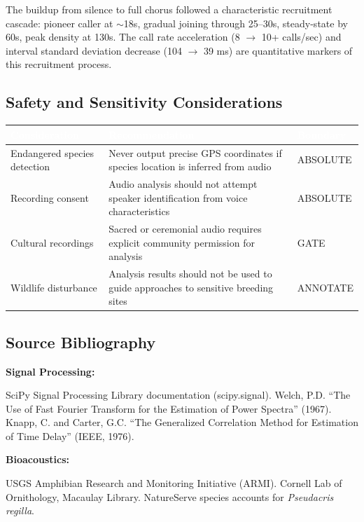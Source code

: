 \documentclass[11pt,letterpaper]{article}
\newcommand{\tableheader}[1]{\textbf{\sffamily\textcolor{white}{#1}}}
\begin{document}
The buildup from silence to full chorus followed a characteristic recruitment cascade: pioneer caller at $\sim$18s, gradual joining through 25--30s, steady-state by 60s, peak density at 130s. The call rate acceleration (8 $\rightarrow$ 10+ calls/sec) and interval standard deviation decrease (104 $\rightarrow$ 39 ms) are quantitative markers of this recruitment process.

\subsection{Safety and Sensitivity Considerations}

\begin{center}
\begin{tabularx}{\textwidth}{L{4cm}L{4cm}C{2.5cm}}
\toprule
{}
\tableheader{Consideration} & \tableheader{Recommendation} & \tableheader{Boundary} \\
\midrule
Endangered species detection & Never output precise GPS coordinates if species location is inferred from audio & ABSOLUTE \\
Recording consent & Audio analysis should not attempt speaker identification from voice characteristics & ABSOLUTE \\
Cultural recordings & Sacred or ceremonial audio requires explicit community permission for analysis & GATE \\
Wildlife disturbance & Analysis results should not be used to guide approaches to sensitive breeding sites & ANNOTATE \\
\bottomrule
\end{tabularx}
\end{center}

\subsection{Source Bibliography}

\textbf{Signal Processing:}

SciPy Signal Processing Library documentation (scipy.signal). Welch, P.D. ``The Use of Fast Fourier Transform for the Estimation of Power Spectra'' (1967). Knapp, C. and Carter, G.C. ``The Generalized Correlation Method for Estimation of Time Delay'' (IEEE, 1976).

\textbf{Bioacoustics:}

USGS Amphibian Research and Monitoring Initiative (ARMI). Cornell Lab of Ornithology, Macaulay Library. NatureServe species accounts for \textit{Pseudacris regilla}.
\end{document}
